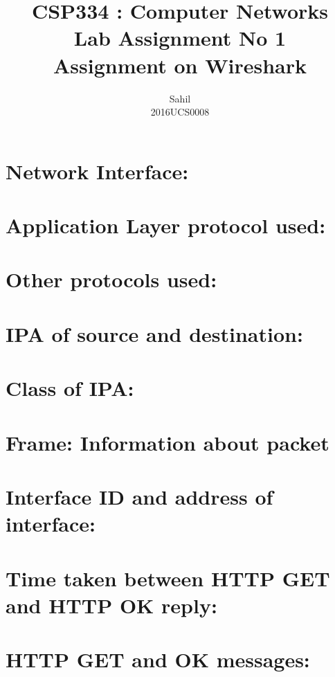 \documentclass[]{report}
\title{\centering CSP334 : Computer Networks \\Lab Assignment No 1\\Assignment on Wireshark}
\author{\LARGE Sahil\\2016UCS0008}
\begin{document}
\maketitle

\section{Network Interface:}


\section{Application Layer protocol used:}


\section{Other protocols used:}


\section{IPA of source and destination:}


\section{Class of IPA:}


\section{Frame: Information about packet}


\section{Interface ID and address of interface:}


\section{Time taken between HTTP GET and HTTP OK reply:}


\section{HTTP GET and OK messages:}
\end{document}
